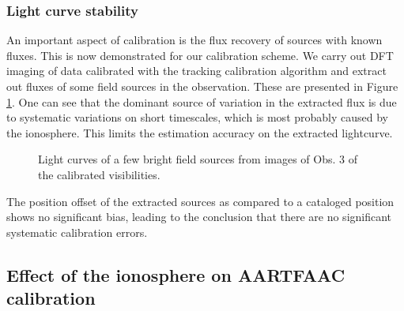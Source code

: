 \documentclass[referee]{aa}
\begin{document}
\subsubsection{Light curve stability}

An important  aspect of calibration is  the flux recovery of  sources with known
fluxes. This is  now demonstrated for our calibration scheme.   We carry out DFT
imaging of data  calibrated with the tracking calibration  algorithm and extract
out fluxes  of some field  sources in the  observation.  These are  presented in
Figure  \ref{fig:Light-curves-of}.  One  can  see that  the  dominant source  of
variation  in  the extracted  flux  is due  to  systematic  variations on  short
timescales, which  is most probably caused  by the ionosphere.   This limits the
estimation accuracy on the extracted lightcurve.

\begin{figure}[tbh]

\caption{\label{fig:Light-curves-of}Light curves of a few bright
field sources from images of Obs. 3 of the calibrated visibilities.}
\end{figure}
The position offset  of the extracted sources as  compared to a cataloged position
shows  no  significant  bias,  leading  to  the conclusion  that  there  are  no
significant systematic calibration errors.


\subsection{\label{sub:iono-effect-on-calib}Effect of the ionosphere on AARTFAAC
calibration}
\end{document}
